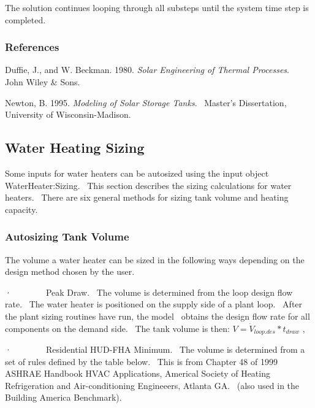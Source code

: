 The solution continues looping through all substeps until the system time step is completed.

\subsubsection{References}\label{references-1-017}

Duffie, J., and W. Beckman. 1980. \emph{Solar Engineering of Thermal Processes}.~ John Wiley \& Sons.

Newton, B. 1995. \emph{Modeling of Solar Storage Tanks}.~ Master's Dissertation, University of Wisconsin-Madison.

\subsection{Water Heating Sizing}\label{water-heating-sizing}

Some inputs for water heaters can be autosized using the input object WaterHeater:Sizing.~ This section describes the sizing calculations for water heaters.~ There are six general methods for sizing tank volume and heating capacity.

\subsubsection{Autosizing Tank Volume}\label{autosizing-tank-volume}

The volume a water heater can be sized in the following ways depending on the design method chosen by the user.

·~~~~~~~~Peak Draw.~ The volume is determined from the loop design flow rate.~ The water heater is positioned on the supply side of a plant loop.~ After the plant sizing routines have run, the model~ obtains the design flow rate for all components on the demand side.~ The tank volume is then: \(V = {\dot V_{loop.des}}*{t_{draw}}\) ,

·~~~~~~~~Residential HUD-FHA Minimum.~ The volume is determined from a set of rules defined by the table below.~ This is from Chapter 48 of 1999 ASHRAE Handbook HVAC Applications, Americal Society of Heating Refrigeration and Air-conditioning Engineeers, Atlanta GA.~ (also used in the Building America Benchmark).

